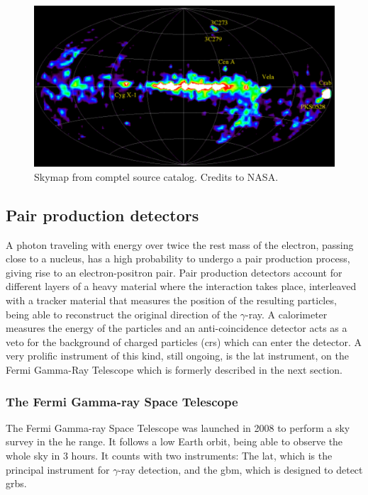\documentclass[main.tex]{subfiles}
\begin{document}
\begin{figure}[h]
  \centering
  \includegraphics[width=1\textwidth]{Pictures/comptel.pdf}
  \caption{Skymap from \gls{comptel} source catalog. Credits to NASA.}
  \label{fig:comptel}
\end{figure}

\subsection{Pair production detectors} \label{sec:pairprod}

A photon traveling with energy over twice the rest mass of the electron, passing close to a nucleus, has a high probability to undergo a pair production process, giving rise to an electron-positron pair.
Pair production detectors account for different layers of a heavy material where the interaction takes place,  interleaved with a tracker material that measures the position of the resulting particles, being able to reconstruct the original direction of the $\gamma$-ray. A calorimeter measures the energy of the particles and an anti-coincidence detector acts as a veto for the background of charged particles (\glspl{cr}) which can enter the detector. A very prolific instrument of this kind, still ongoing, is the \gls{lat} instrument, on the Fermi Gamma-Ray Telescope which is formerly described in the next section.

\subsubsection{The Fermi Gamma-ray Space Telescope} \label{sec:fermi}

The Fermi Gamma-ray Space Telescope was launched in 2008 to perform a sky survey in the \gls{he} range. It follows a low Earth orbit, being able to observe the whole sky in 3 hours. It counts with two instruments: The \gls{lat}, which is the principal instrument for $\gamma$-ray detection, and the \gls{gbm}, which is designed to detect \glspl{grb}.\\
\end{document}
